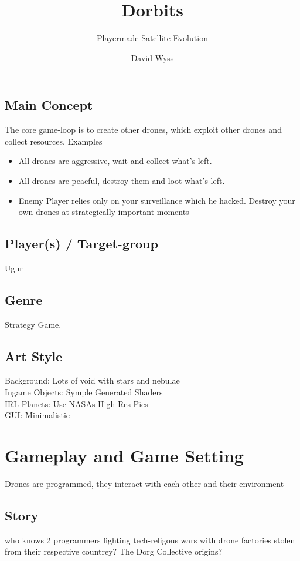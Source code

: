 \documentclass[a4paper]{scrreprt}
\title{Dorbits}
\subtitle{Playermade Satellite Evolution}
\author{David Wyss}
\begin{document}
\maketitle

\tableofcontents

\section{Main Concept}
The core game-loop is to create other drones, which exploit other drones and collect resources. 
Examples
\begin{itemize}
	\item All drones are aggressive, wait and collect what's left.
	\item All drones are peacful, destroy them and loot  what's left.
	\item Enemy Player relies only on your surveillance which he hacked. Destroy your own drones at strategically important moments
\end{itemize}

\section{Player(s) / Target-group}
Ugur

\section{Genre}
Strategy Game.

\section{Art Style}
Background: Lots of void with stars and nebulae\\
Ingame Objects: Symple Generated Shaders\\
IRL Planets: Use NASAs High Res Pics\\
GUI: Minimalistic

\chapter{Gameplay and Game Setting}
Drones are programmed, they interact with each other and their environment

\section{Story}
who knows 2 programmers fighting tech-religous wars with drone factories stolen from their respective countrey? The Dorg Collective origins?
\end{document}
